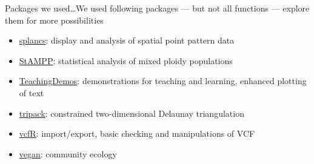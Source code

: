 \documentclass[compress, ucs, xelatex, 11pt, xcolor=svgnames, aspectratio=169,
	hyperref={
		bookmarks=true,
		unicode=true,
		colorlinks=true,
		pdftitle={Molecular data in R},
		plainpages=false,
		pdfauthor={Vojtech Zeisek},
		pdfsubject={Course about phylogeny and evolution in R},
		pdfcreator={XeLaTeX},
		pdfkeywords={R, evolution, phylogeny, molecular data},
		linkcolor=Crimson, %
		anchorcolor=Magenta, %
		citecolor=Magenta, %
		filecolor=Magenta, %
		menucolor=Magenta, %
		urlcolor=DodgerBlue, %
		pdftex},
	url={hyphens, lowtilde} %
	]{beamer}
\begin{document}
\begin{frame}[allowframebreaks]{Packages we used\ldots}{We used following packages --- but not all functions --- explore them for more possibilities}
\begin{itemize}
		\item \href{https://CRAN.R-project.org/package=splancs}{splancs}: display and analysis of spatial point pattern data
		\item \href{https://CRAN.R-project.org/package=StAMPP}{StAMPP}: statistical analysis of mixed ploidy populations
		\item \href{https://CRAN.R-project.org/package=TeachingDemos}{TeachingDemos}: demonstrations for teaching and learning, enhanced plotting of text
		\item \href{https://CRAN.R-project.org/package=tripack}{tripack}: constrained two-dimensional Delaunay triangulation
		\item \href{https://CRAN.R-project.org/package=vcfR}{vcfR}: import/export, basic checking and manipulations of VCF
		\item \href{https://CRAN.R-project.org/package=vegan}{vegan}: community ecology
	\end{itemize}
\end{frame}
\end{document}
